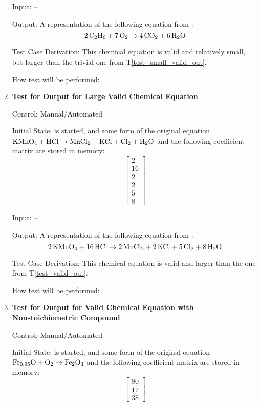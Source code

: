 \documentclass[12pt, titlepage]{article}
\newcounter{testnum} %
\newcommand{\testref}[1]{T\ref{#1}}
\begin{document}
\begin{enumerate}
    Input: --

    Output: A representation of the following equation from
    \cite[p.~523]{hamid_balancing_2019}:
    $$\ce{2C2H6} + \ce{7O2} \rightarrow \ce{4CO2} + \ce{6H2O}$$

    Test Case Derivation: This chemical equation is
    valid and relatively small, but larger than the trivial one from
    \testref{test_small_valid_out}.

    How test will be performed: 

  \item[T\refstepcounter{testnum}\thetestnum \label{test_large_valid_out}:]
    \textbf{Test for Output for Large Valid Chemical Equation}

    Control: Manual/Automated 

    Initial State: \progname{} is started, and some form of the original
    equation $\ce{KMnO4} + \ce{HCl} \rightarrow \ce{MnCl2} + \ce{KCl} +
      \ce{Cl2} + \ce{H2O}$ \cite{taylor_balancing_2021} and the following
    coefficient matrix are stored in memory:
    $$\begin{bmatrix}
        2  \\
        16 \\
        2  \\
        2  \\
        5  \\
        8
      \end{bmatrix}$$

    Input: --

    Output: A representation of the following equation from
    \cite{taylor_balancing_2021}:
    $$\ce{2KMnO4} + \ce{16HCl} \rightarrow \ce{2MnCl2} + \ce{2KCl} +
      \ce{5Cl2} + \ce{8H2O}$$


    Test Case Derivation: This chemical equation is
    valid and larger than the one from \testref{test_valid_out}.

    How test will be performed: 

  \item[T\refstepcounter{testnum}\thetestnum \label{test_nonstoich_valid_out}:]
    \textbf{Test for Output for Valid Chemical Equation with
      Nonstoichiometric Compound}

    Control: Manual/Automated 

    Initial State: \progname{} is started, and some form of the original
    equation $\ce{Fe_{0.95}O} + \ce{O2} \rightarrow \ce{Fe2O3}$
    \cite{doubtnut_when_nodate} and the following
    coefficient matrix are stored in memory:
    $$\begin{bmatrix}
        80 \\
        17 \\
        38
      \end{bmatrix}$$


\end{enumerate}
\end{document}
